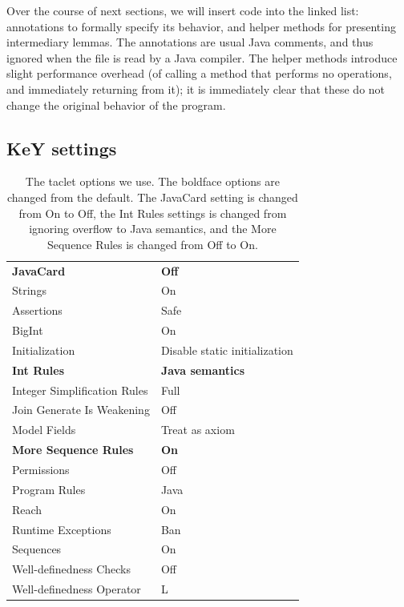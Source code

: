 \documentclass[runningheads]{llncs}
\begin{document}
Over the course of next sections, we will insert code into the linked list: annotations to formally specify its behavior, and helper methods for presenting intermediary lemmas. The annotations are usual Java comments, and thus ignored when the file is read by a Java compiler. The helper methods introduce slight performance overhead (of calling a method that performs no operations, and immediately returning from it); it is immediately clear that these do not change the original behavior of the program.

\subsection{KeY settings}

\begin{table}[]
    \begin{tabular}{l@{\hskip6pt}|@{\hskip6pt}l}
    \textbf{JavaCard} & \textbf{Off} \\
    Strings & On \\
    Assertions & Safe \\
    BigInt & On \\
    Initialization & Disable static initialization \\
    \textbf{Int Rules} & \textbf{Java semantics} \\
    Integer Simplification Rules & Full \\
    Join Generate Is Weakening & Off \\
    Model Fields & Treat as axiom \\
    \textbf{More Sequence Rules} & \textbf{On} \\
    Permissions & Off \\
    Program Rules & Java \\
    Reach & On \\
    Runtime Exceptions & Ban \\
    Sequences & On \\
    Well-definedness Checks & Off \\
    Well-definedness Operator & L
    \end{tabular}
    \medskip
    \caption{The taclet options we use. The boldface options are changed from the default. The JavaCard setting is changed from On to Off, the Int Rules settings is changed from ignoring overflow to Java semantics, and the More Sequence Rules is changed from Off to On.}
    \label{tab:taclet-options}
\end{table}
\end{document}
